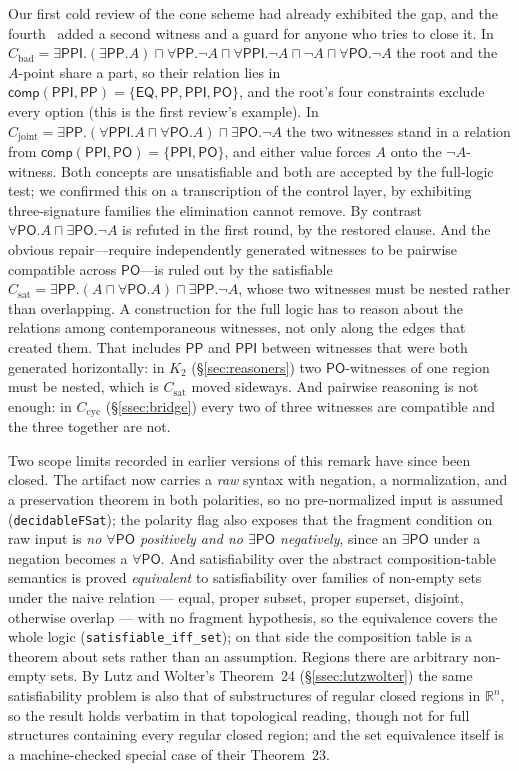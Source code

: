 \documentclass[11pt]{article}
\newcommand{\PO}{\mathsf{PO}}
\newcommand{\PP}{\mathsf{PP}}
\newcommand{\PPI}{\mathsf{PPI}}
\newcommand{\EQ}{\mathsf{EQ}}
\newcommand{\code}[1]{\texttt{#1}}
\newcommand{\reals}{\mathbb{R}}
\newcommand{\comp}{\ensuremath{\mathsf{comp}}}
\theoremstyle{plain}
\theoremstyle{definition}
\begin{document}
Our first cold review of the cone scheme had already exhibited the gap, and
the fourth~\cite{GPT56SolReview} added a second witness and a guard
for anyone who tries to close it. In
$C_{\mathrm{bad}}=\exists\PPI.(\exists\PP.A)\sqcap\forall\PP.\neg A\sqcap
\forall\PPI.\neg A\sqcap\neg A\sqcap\forall\PO.\neg A$ the root and the
$A$-point share a part, so their relation lies in
$\comp(\PPI,\PP)=\{\EQ,\PP,\PPI,\PO\}$, and the root's four constraints
exclude every option (this is the first review's example). In $C_{\mathrm{joint}}=\exists\PP.(\forall\PPI.A\sqcap
\forall\PO.A)\sqcap\exists\PO.\neg A$ the two witnesses stand in a relation
from $\comp(\PPI,\PO)=\{\PPI,\PO\}$, and either value forces $A$ onto the
$\neg A$-witness. Both concepts are unsatisfiable and both are accepted by
the full-logic test; we confirmed this on a transcription of the control
layer, by exhibiting three-signature families the elimination cannot remove.
By contrast $\forall\PO.A\sqcap\exists\PO.\neg A$ is refuted in the first
round, by the restored clause. And the obvious repair---require independently
generated witnesses to be pairwise compatible across $\PO$---is ruled out by
the satisfiable $C_{\mathrm{sat}}=\exists\PP.(A\sqcap\forall\PO.A)\sqcap
\exists\PP.\neg A$, whose two witnesses must be nested rather than
overlapping. A construction for the full logic has to reason about the
relations among contemporaneous witnesses, not only along the edges that
created them. That includes $\PP$ and $\PPI$ between witnesses that were both
generated horizontally: in $K_2$ (\S\ref{sec:reasoners}) two $\PO$-witnesses
of one region must be nested, which is $C_{\mathrm{sat}}$ moved sideways. And
pairwise reasoning is not enough: in $C_{\mathrm{cyc}}$ (\S\ref{ssec:bridge})
every two of three witnesses are compatible and the three together are not.

Two scope limits recorded in earlier versions of this remark have since been
closed. The artifact now carries a \emph{raw} syntax with negation, a
normalization, and a preservation theorem in both polarities, so no
pre-normalized input is assumed (\code{decidableFSat}); the polarity flag also
exposes that the fragment condition on raw input is \emph{no $\forall\PO$
positively and no $\exists\PO$ negatively}, since an $\exists\PO$ under a
negation becomes a $\forall\PO$. And satisfiability over the abstract
composition-table semantics is proved \emph{equivalent} to satisfiability over
families of non-empty sets under the naive relation --- equal, proper subset,
proper superset, disjoint, otherwise overlap --- with no fragment hypothesis, so
the equivalence covers the whole logic (\code{satisfiable\_iff\_set}); on that
side the composition table is a theorem about sets rather than an assumption.
Regions there are arbitrary non-empty sets. By Lutz and Wolter's
Theorem~24 (\S\ref{ssec:lutzwolter}) the same satisfiability problem is also
that of substructures of regular closed regions in $\reals^n$, so the result
holds verbatim in that topological reading, though not for full structures
containing every regular closed region; and the set equivalence itself is a
machine-checked special case of their Theorem~23.
\end{document}
